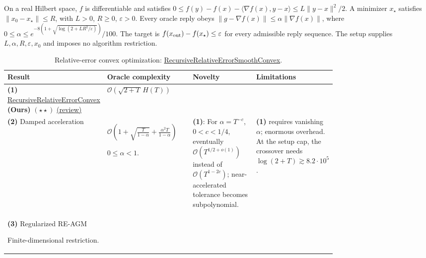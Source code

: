 \begin{table}[tp]
\centering
\caption{Relative-error convex optimization: \href{https://github.com/k3nfalt/longtails/blob/main/LongTails/Setups/RecursiveRelativeErrorSmoothConvex.lean}{RecursiveRelativeErrorSmoothConvex}.}\label{tab:RecursiveRelativeErrorSmoothConvex}
\parbox{\linewidth}{\footnotesize On a real Hilbert space, $f$ is differentiable and satisfies $0\le f(y)-f(x)-\langle\nabla f(x),y-x\rangle\le L\|y-x\|^2/2$. A minimizer $x_\star$ satisfies $\|x_0-x_\star\|\le R$, with $L>0$, $R\ge0$, $\varepsilon>0$. Every oracle reply obeys $\|g-\nabla f(x)\|\le\alpha\|\nabla f(x)\|$, where $0\le\alpha\le e^{-8(1+\sqrt{\log(2+LR^2/\varepsilon)})}/100$. The target is $f(x_{\rm out})-f(x_\star)\le\varepsilon$ for every admissible reply sequence. The setup supplies $L,\alpha,R,\varepsilon,x_0$ and imposes no algorithm restriction.}\par\smallskip
\begin{threeparttable}
\footnotesize
\setlength{\tabcolsep}{4pt}\renewcommand{\arraystretch}{1.25}
\begin{tabularx}{\linewidth}{@{}>{\raggedright\arraybackslash}p{0.20\linewidth}>{\raggedright\arraybackslash}p{0.32\linewidth}>{\raggedright\arraybackslash}p{0.25\linewidth}>{\raggedright\arraybackslash}X@{}}
\toprule
\textbf{Result} & \textbf{Oracle complexity} & \textbf{Novelty} & \textbf{Limitations} \\
\midrule
\textbf{(1)} \href{https://github.com/k3nfalt/longtails/blob/main/LongTails/Theorems/RecursiveRelativeErrorConvex.lean}{Recursive\allowbreak Relative\allowbreak Error\allowbreak Convex} \textbf{(Ours)} $(\star\star)$ \href{https://github.com/k3nfalt/longtails/blob/main/scripts/reviews/RecursiveRelativeErrorConvex.md}{(review)}
& $\mathcal{O}\!\left(\sqrt{2+T}\,H(T)\right)$ & & \\
\midrule[1.2pt]
\textbf{(2)} Damped acceleration \citep{rreLongTailsDampedNote}
& $\mathcal{O}\!\left(1+\sqrt{\frac{T}{1-\alpha}}+\frac{\alpha^2T}{1-\alpha}\right)$\par $0\le\alpha<1$.
& \textbf{(1)}: For $\alpha=T^{-c}$, $0<c<1/4$, eventually $\mathcal{O}(T^{1/2+o(1)})$ instead of $\mathcal{O}(T^{1-2c})$; near-accelerated tolerance becomes subpolynomial.
& \textbf{(1)} requires vanishing $\alpha$; enormous overhead. At the setup cap, the crossover needs $\log(2+T)\gtrsim8.2\cdot10^5$. \\
\midrule
\textbf{(3)} Regularized RE-AGM \citep[Thm.~9.3]{igsVasinGasnikov2026v1}\par Finite-dimensional restriction.

\end{tabularx}
\end{threeparttable}
\end{table}
